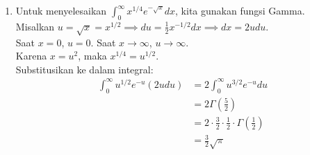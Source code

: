 \documentclass[11pt,letterpaper]{article}
\begin{document}
\begin{enumerate}
  \item Untuk menyelesaikan $\int_{0}^{\infty} x^{1/4} e^{-\sqrt{x}} dx$, kita gunakan fungsi Gamma. \\
        Misalkan $u = \sqrt{x} = x^{1/2} \implies du = \frac{1}{2} x^{-1/2} dx \implies dx = 2u du$. \\
        Saat $x = 0$, $u = 0$. Saat $x \to \infty$, $u \to \infty$. \\
        Karena $x = u^2$, maka $x^{1/4} = u^{1/2}$. \\
        Substitusikan ke dalam integral:
        \begin{align*}
          \int_{0}^{\infty} u^{1/2} e^{-u} (2u du) & = 2 \int_{0}^{\infty} u^{3/2} e^{-u} du                                      \\
                                                   & = 2 \Gamma\left(\frac{5}{2}\right)                                           \\
                                                   & = 2 \cdot \frac{3}{2} \cdot \frac{1}{2} \cdot \Gamma\left(\frac{1}{2}\right) \\
                                                   & = \frac{3}{2} \sqrt{\pi}
        \end{align*}


\end{enumerate}
\end{document}
